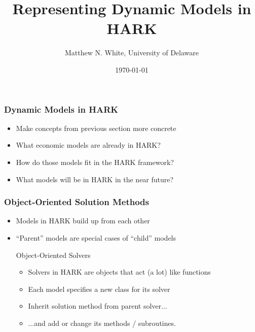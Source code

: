 \documentclass[11pt]{cfpbpresentation}
\author{Matthew N. White, University of Delaware}
\title{Representing Dynamic Models in HARK}
\date{\today}
\begin{document}
\begin{frame}
\maketitle
\end{frame}


\begin{frame}
\frametitle{Dynamic Models in HARK}
\begin{itemize}
\item Make concepts from previous section more concrete

\item What economic models are already in HARK?

\item How do those models fit in the HARK framework?

\item What models will be in HARK in the near future? 
\end{itemize}
\end{frame}


\begin{frame}
\frametitle{Object-Oriented Solution Methods}
\begin{itemize}
\item Models in HARK build up from each other

\item ``Parent'' models are special cases of ``child'' models

\begin{block}{Object-Oriented Solvers}
\begin{itemize}
\item Solvers in HARK are objects that act (a lot) like functions

\item Each model specifies a new class for its solver

\item Inherit solution method from parent solver...

\item ...and add or change its methods / subroutines.
\end{itemize}
\end{block}

\end{itemize}
\end{frame}
\end{document}
